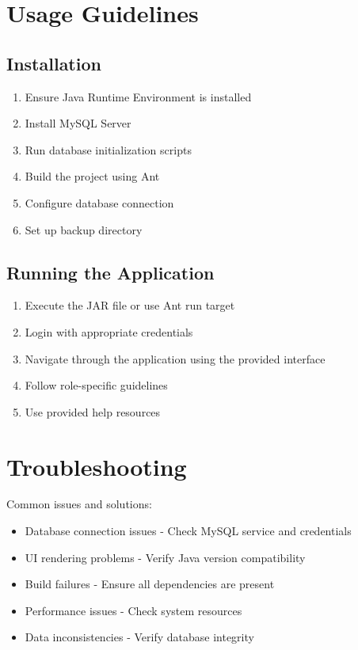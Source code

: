 \documentclass[12pt,a4paper]{article}
\begin{document}
\section{Usage Guidelines}

\subsection{Installation}
\begin{enumerate}
    \item Ensure Java Runtime Environment is installed
    \item Install MySQL Server
    \item Run database initialization scripts
    \item Build the project using Ant
    \item Configure database connection
    \item Set up backup directory
\end{enumerate}

\subsection{Running the Application}
\begin{enumerate}
    \item Execute the JAR file or use Ant run target
    \item Login with appropriate credentials
    \item Navigate through the application using the provided interface
    \item Follow role-specific guidelines
    \item Use provided help resources
\end{enumerate}

\section{Troubleshooting}
Common issues and solutions:
\begin{itemize}
    \item Database connection issues - Check MySQL service and credentials
    \item UI rendering problems - Verify Java version compatibility
    \item Build failures - Ensure all dependencies are present
    \item Performance issues - Check system resources
    \item Data inconsistencies - Verify database integrity
\end{itemize}
\end{document}
